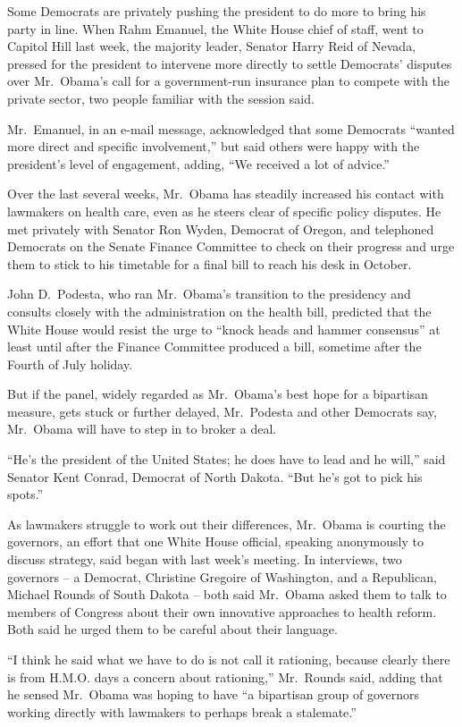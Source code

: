 ﻿\documentclass[12pt]{article}
\begin{document}
Some Democrats are privately pushing the president to do more to bring his party in line. When Rahm
Emanuel, the White House chief of staff, went to Capitol Hill last week, the majority leader,
Senator Harry Reid of Nevada, pressed for the president to intervene more directly to settle
Democrats' disputes over Mr.~Obama's call for a government-run insurance plan to compete with the
private sector, two people familiar with the session said.

Mr.~Emanuel, in an e-mail message, acknowledged that some Democrats ``wanted more direct and
specific involvement,'' but said others were happy with the president's level of engagement, adding,
``We received a lot of advice.''

Over the last several weeks, Mr.~Obama has steadily increased his contact with lawmakers on health
care, even as he steers clear of specific policy disputes. He met privately with Senator Ron Wyden,
Democrat of Oregon, and telephoned Democrats on the Senate Finance Committee to check on their
progress and urge them to stick to his timetable for a final bill to reach his desk in October.

John D.~Podesta, who ran Mr.~Obama's transition to the presidency and consults closely with the
administration on the health bill, predicted that the White House would resist the urge to ``knock
heads and hammer consensus'' at least until after the Finance Committee produced a bill, sometime
after the Fourth of July holiday.

But if the panel, widely regarded as Mr.~Obama's best hope for a bipartisan measure, gets stuck or
further delayed, Mr.~Podesta and other Democrats say, Mr.~Obama will have to step in to broker a
deal.

``He's the president of the United States; he does have to lead and he will,'' said Senator Kent
Conrad, Democrat of North Dakota. ``But he's got to pick his spots.''

As lawmakers struggle to work out their differences, Mr.~Obama is courting the governors, an effort
that one White House official, speaking anonymously to discuss strategy, said began with last week's
meeting. In interviews, two governors -- a Democrat, Christine Gregoire of Washington, and a
Republican, Michael Rounds of South Dakota -- both said Mr.~Obama asked them to talk to members of
Congress about their own innovative approaches to health reform. Both said he urged them to be
careful about their language.

``I think he said what we have to do is not call it rationing, because clearly there is from H.M.O.
days a concern about rationing,'' Mr.~Rounds said, adding that he sensed Mr.~Obama was hoping to
have ``a bipartisan group of governors working directly with lawmakers to perhaps break a
stalemate.''
\end{document}

